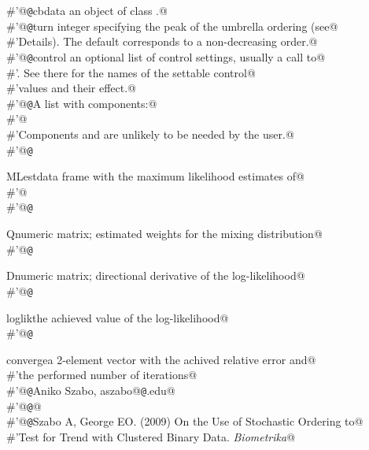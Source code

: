 \documentclass[reqno]{amsart}
\begin{document}
\begin{flushleft}
\begin{list}{}{}
\mbox{}\verb@#'@{\tt @}\verb@param cbdata an object of class .@\\
\mbox{}\verb@#'@{\tt @}\verb@param turn integer specifying the peak of the umbrella ordering (see@\\
\mbox{}\verb@#'Details). The default corresponds to a non-decreasing order.@\\
\mbox{}\verb@#'@{\tt @}\verb@param control an optional list of control settings, usually a call to@\\
\mbox{}\verb@#'.  See there for the names of the settable control@\\
\mbox{}\verb@#'values and their effect.@\\
\mbox{}\verb@#'@{\tt @}\verb@return A list with components:@\\
\mbox{}\verb@#'@\\
\mbox{}\verb@#'Components  and  are unlikely to be needed by the user.@\\
\mbox{}\verb@#'@{\tt @}\verb@return \item{MLest}{data frame with the maximum likelihood estimates of@\\
\mbox{}\verb@#'}@\\
\mbox{}\verb@#'@{\tt @}\verb@return \item{Q}{numeric matrix; estimated weights for the mixing distribution}@\\
\mbox{}\verb@#'@{\tt @}\verb@return \item{D}{numeric matrix; directional derivative of the log-likelihood}@\\
\mbox{}\verb@#'@{\tt @}\verb@return \item{loglik}{the achieved value of the log-likelihood}@\\
\mbox{}\verb@#'@{\tt @}\verb@return \item{converge}{a 2-element vector with the achived relative error and@\\
\mbox{}\verb@#'the performed number of iterations}@\\
\mbox{}\verb@#'@{\tt @}\verb@author Aniko Szabo, aszabo@{\tt @}\verb@mcw.edu@\\
\mbox{}\verb@#'@{\tt @}\verb@seealso {}@\\
\mbox{}\verb@#'@{\tt @}\verb@references Szabo A, George EO. (2009) On the Use of Stochastic Ordering to@\\
\mbox{}\verb@#'Test for Trend with Clustered Binary Data. \emph{Biometrika}@\\

\end{list}
\end{flushleft}
\end{document}

